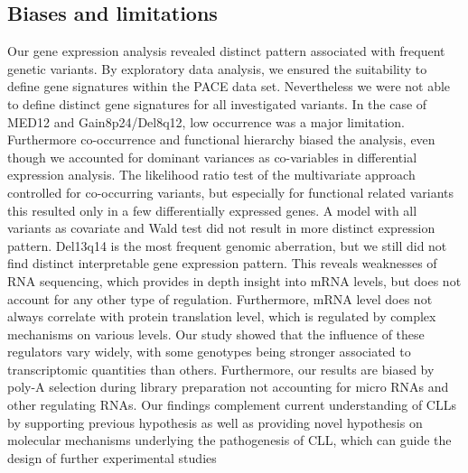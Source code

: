 \subsection{Biases and limitations}
Our gene expression analysis revealed distinct pattern associated with frequent genetic variants. By exploratory data analysis, we ensured the suitability to define gene signatures within the PACE data set. Nevertheless we were not able to define distinct gene signatures for all investigated variants. In the case of MED12 and Gain8p24/Del8q12, low occurrence was a major limitation. Furthermore co-occurrence and functional hierarchy biased the analysis, even though we accounted for dominant variances as co-variables in differential expression analysis. The likelihood ratio test of the multivariate approach controlled for co-occurring variants, but especially for functional related variants this resulted only in a few differentially expressed genes. A model with all variants as covariate and Wald test did not result in more distinct expression pattern.
Del13q14 is the most frequent genomic aberration, but we still did not find distinct interpretable gene expression pattern. This reveals weaknesses of RNA sequencing, which provides in depth insight into mRNA levels, but does not account for any other type of regulation. Furthermore, mRNA level does not always correlate with protein translation level, which is regulated by complex mechanisms on various levels. Our study showed that the influence of these regulators vary widely, with some genotypes being stronger associated to transcriptomic quantities than others. Furthermore, our results are biased by poly-A selection during library preparation not accounting for micro RNAs and other regulating RNAs. Our findings complement current understanding of CLLs by supporting previous hypothesis as well as providing novel hypothesis on molecular mechanisms underlying the pathogenesis of CLL, which can guide the design of further experimental studies 
